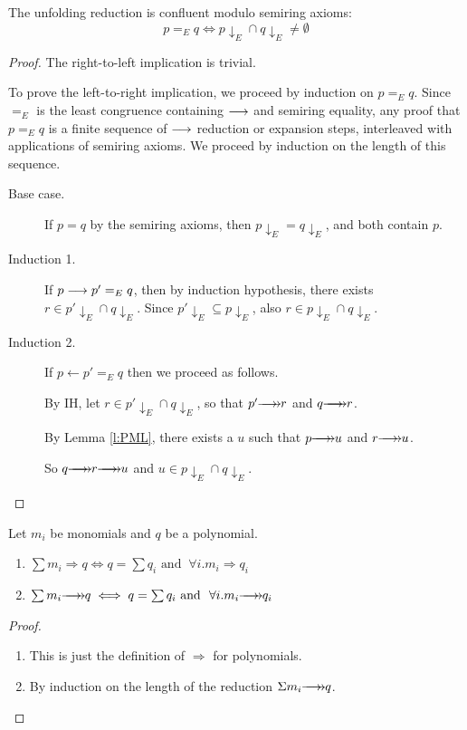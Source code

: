 \documentclass[numbers=enddot]{scrartcl}
\newcommand{\downe}[1]{{#1}{\downarrow_E}}
\newcommand{\LRA}{\Longrightarrow}
\begin{document}
\begin{prop}
  \label{p:CR}
The unfolding reduction is confluent modulo semiring axioms:
\[ p =_E q \iff \downe{p} \cap \downe{q} \neq \emptyset \]
\end{prop}

\begin{proof}
The right-to-left implication is trivial.

To prove the left-to-right implication, we proceed by induction on $p=_E q$.
Since $=_E$ is the least congruence containing $\mathrel{\longrightarrow}$ and semiring equality,
any proof that $p=_E q$ is a finite sequence of $\mathrel{\longrightarrow}$ reduction or expansion steps, interleaved with
applications of semiring axioms.  We proceed by induction on the length of this sequence.
\begin{description}
\item[Base case.] If $p = q$ by the semiring axioms, then $\downe{p} = \downe{q}$, and both contain $p$.
\item[Induction 1.] If $p \mathrel{\longrightarrow} p' =_E q$, then by induction hypothesis,
there exists $r \in \downe{p'} \cap \downe{q}$.  Since $\downe{p'} \subseteq \downe{p}$,
also $r \in \downe{p} \cap \downe{q}$.
\item[Induction 2.] If $p \longleftarrow p' =_E q$ then we proceed as follows.

By IH, let $r \in \downe{p'} \cap \downe{q}$, so that $p' \thra r$ and $q \thra r$.

By Lemma \ref{l:PML}, there exists a $u$ such that
$p \thra u$ and $r \thra u$.

So $q \thra r \thra u$ and $u \in \downe{p} \cap \downe{q}$. \qedhere
\end{description}
\end{proof}

\begin{prop} Let $m_i$ be monomials and $q$ be a polynomial.
  \label{p:sum-red}
  \begin{enumerate}
    \item
    $\sum m_i \LRA q \iff q = \sum q_i \text{ and }\ \forall i. m_i \LRA q_i$
    \item
    $\sum m_i \thra q \iff q = \sum q_i \text{ and }\ \forall i. m_i \thra q_i$
  \end{enumerate}
\end{prop}
\begin{proof}
  \begin{enumerate}
    \item
    This is just the definition of $\LRA$ for polynomials.
    \item
    By induction on the length of the reduction $\Sigma m_i \thra q$. \qedhere
  \end{enumerate}
\end{proof}
\end{document}
